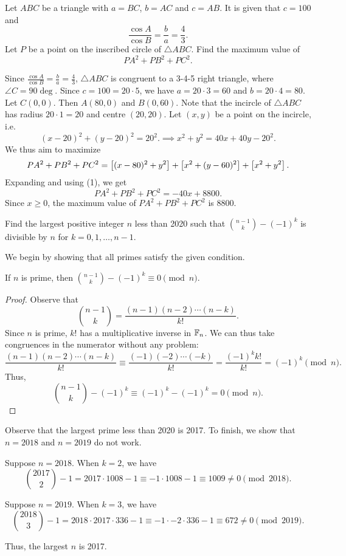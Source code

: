 \begin{question}[8800]\label{A::2020-O-1-17}
    Let $ABC$ be a triangle with $a = BC$, $b = AC$ and $c = AB$. It is given that $c = 100$ and \[\frac{\cos A}{\cos B} = \frac{b}{a} = \frac43.\] Let $P$ be a point on the inscribed circle of $\triangle ABC$. Find the maximum value of \[PA^2 + PB^2 + PC^2.\]
\end{question}
\begin{solution*}
    Since $\frac{\cos A}{\cos B} = \frac{b}{a} = \frac43$, $\triangle ABC$ is congruent to a 3-4-5 right triangle, where $\angle C = 90\deg$. Since $c = 100 = 20 \cdot 5$, we have $a = 20 \cdot 3 = 60$ and $b = 20 \cdot 4 = 80$. Let $C(0,0)$. Then $A(80, 0)$ and $B(0, 60)$. Note that the incircle of $\triangle ABC$ has radius $20 \cdot 1 = 20$ and centre $(20, 20)$. Let $(x, y)$ be a point on the incircle, i.e. \[(x-20)^2 + (y-20)^2 = 20^2.\implies x^2 + y^2 = 40x + 40y - 20^2 \tag{1}.\] We thus aim to maximize \[PA^2 + PB^2 + PC^2 = \left[ (x-80)^2 + y^2 \right] + \left[ x^2 + (y-60)^2 \right] + \left[ x^2 + y^2 \right].\] Expanding and using (1), we get \[PA^2 + PB^2 + PC^2 = -40x + 8800.\] Since $x \geq 0$, the maximum value of $PA^2 + PB^2 + PC^2$ is 8800.
\end{solution*}

\begin{question}[2017]\label{A::2020-O-1-18}
    Find the largest positive integer $n$ less than 2020 such that $\binom{n-1}{k} - (-1)^k$ is divisible by $n$ for $k = 0, 1, \ldots, n-1$.
\end{question}
\begin{solution*}
    We begin by showing that all primes satisfy the given condition.
    \begin{claim}
        If $n$ is prime, then $\binom{n-1}{k} - (-1)^k \equiv 0 \pmod{n}$.
    \end{claim}
    \begin{proof}
        Observe that \[\binom{n-1}{k} = \frac{(n-1)(n-2)\cdots(n-k)}{k!}.\] Since $n$ is prime, $k!$ has a multiplicative inverse in $\mathbb{F}_n$. We can thus take congruences in the numerator without any problem: \[\frac{(n-1)(n-2)\cdots(n-k)}{k!} \equiv \frac{(-1)(-2)\cdots(-k)}{k!} = \frac{(-1)^k k!}{k!} = (-1)^k \pmod{n}.\] Thus, \[\binom{n-1}{k} - (-1)^k \equiv (-1)^k - (-1)^k = 0 \pmod{n}.\]
    \end{proof}
    
    Observe that the largest prime less than 2020 is 2017. To finish, we show that $n = 2018$ and $n = 2019$ do not work.
    
     Suppose $n = 2018$. When $k = 2$, we have \[\binom{2017}{2} - 1 = 2017 \cdot 1008 - 1 \equiv -1 \cdot 1008 - 1 \equiv 1009 \neq 0 \pmod{2018}.\]
    
     Suppose $n = 2019$. When $k = 3$, we have \[\binom{2018}{3} - 1 = 2018 \cdot 2017 \cdot 336 - 1 \equiv -1 \cdot -2 \cdot 336 - 1 \equiv 672 \neq 0 \pmod{2019}.\]
    
    Thus, the largest $n$ is 2017.
\end{solution*}

